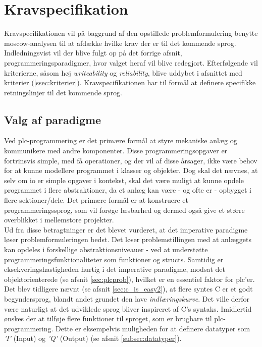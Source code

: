 \section{Kravspecifikation}\label{sct:kravspec}
Kravspecifikationen vil på baggrund af den opstillede problemformulering benytte \gls{moscow}-analysen til at afdække hvilke krav der er til det kommende sprog. Indledningsvist vil der blive fulgt op på det forrige afsnit, programmeringsparadigmer, hvor valget heraf vil blive redegjort. Efterfølgende vil kriterierne, såsom høj \textit{writeability} og \textit{reliability}, blive uddybet i afsnittet med kriterier (\ref{ssec:kriterier}). Kravspecifikationen har til formål at definere specifikke retningslinjer til det kommende sprog.

\subsection{Valg af paradigme}\label{ssec:paradigmevalg}
Ved \gls{plc}-programmering er det primære formål at styre mekaniske anlæg og kommunikere med andre komponenter. Disse programmeringsopgaver er fortrinsvis simple, med få operationer, og der vil af disse årsager, ikke være behov for at kunne modellere programmet i klasser og objekter. Dog skal det nævnes, at selv om \gls{io} er simple opgaver i kontekst, skal det være muligt at kunne opdele programmet i flere abstraktioner, da et anlæg kan være - og ofte er - opbygget i flere sektioner/dele. Det primære formål er at konstruere et programmeringssprog, som vil forøge læsbarhed og dermed også give et større overblikket i mellemstore projekter. \\

\noindent Ud fra disse betragtninger er det blevet vurderet, at det imperative paradigme løser problemformuleringen bedst. Det løser problemstillingen med at anlæggets kan opdeles i forskellige abstraktionsniveauer - ved at understøtte programmeringsfunktionaliteter som funktioner og structs. Samtidig er eksekveringshastigheden hurtig i det imperative paradigme, modsat det objektorienterede (se afsnit \ref{sec:plcprob}), hvilket er en essentiel faktor for \gls{plc}'er. \\

\noindent Det blev tidligere nævnt (se afsnit \ref{sec:c_is_easy2}), at flere syntes C er et godt begyndersprog, blandt andet grundet den lave \textit{indlæringskurve}. Det ville derfor være naturligt at det udviklede sprog bliver inspireret af C's syntaks. Imidlertid ønskes der at tilføje flere funktioner til sproget, som er brugbare til \gls{plc}-programmering. Dette er eksempelvis muligheden for at definere datatyper som \textit{'I'} (Input) og \textit{'Q'} (Output) (se afsnit \ref{subsec:datatyper}). \\

